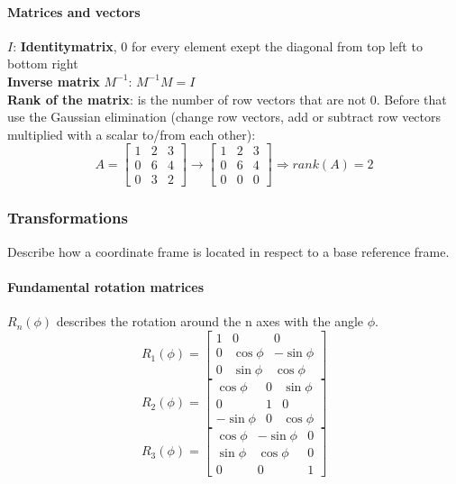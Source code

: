 \documentclass[12pt]{article}
\begin{document}
	\paragraph{Matrices and vectors}
	$I$: \textbf{Identitymatrix}, 0 for every element exept the diagonal from top left to bottom right\\
	\textbf{Inverse matrix} $M^{-1}$: $M^{-1} M = I$\\
	\textbf{Rank of the matrix}: is the number of row vectors that are not 0. Before that use the Gaussian elimination (change row vectors, add or subtract row vectors multiplied with a scalar to/from each other):
	\begin{equation}
	A = 
	\begin{bmatrix}
	1 & 2 & 3\\
	0 & 6 & 4\\
	0 & 3 & 2
	\end{bmatrix}
	\rightarrow
	\begin{bmatrix}
	1 & 2 & 3\\
	0 & 6 & 4\\
	0 & 0 & 0
	\end{bmatrix}
	\Rightarrow
	rank(A) = 2
	\end{equation}
	
	
	\subsubsection{Transformations}
	Describe how a coordinate frame is located in respect to a base reference frame.
	\paragraph{Fundamental rotation matrices} $R_{n}(\phi)$ describes the rotation around the n axes with the angle $\phi$.\\
	\begin{equation}
	R_{1}(\phi) = 
	\begin{bmatrix}
	1 & 0 & 0\\
	0 & \cos \phi & -\sin \phi\\
	0 & \sin \phi & \cos \phi
	\end{bmatrix}
	\end{equation}
	\begin{equation}
	R_{2}(\phi) = 
	\begin{bmatrix}
	\cos \phi & 0 & \sin \phi\\
	0 & 1 & 0\\
	-\sin \phi & 0 & \cos \phi
	\end{bmatrix}
	\end{equation}
	\begin{equation}
	R_{3}(\phi) = 
	\begin{bmatrix}
	\cos \phi & -\sin \phi & 0\\
	\sin \phi & \cos \phi & 0\\
	0 & 0 & 1
	\end{bmatrix}
	\end{equation}
	
\end{document}
